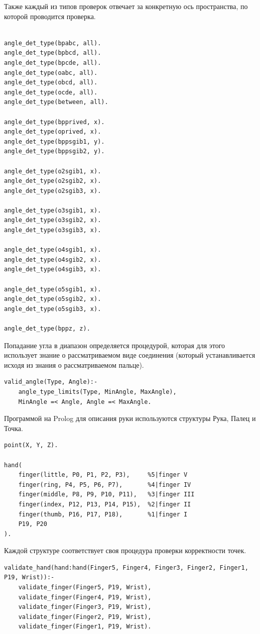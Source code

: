 Также каждый из типов проверок отвечает за конкретную ось пространства, по которой проводится проверка.
\begin{lstlisting}[caption=Знания об осях типов проверок, label=list:angle_det_type]
%angle_det_type(Type, Axis)

angle_det_type(bpabc, all).
angle_det_type(bpbcd, all).
angle_det_type(bpcde, all).
angle_det_type(oabc, all).
angle_det_type(obcd, all).
angle_det_type(ocde, all).
angle_det_type(between, all).

angle_det_type(bpprived, x).
angle_det_type(oprived, x).
angle_det_type(bppsgib1, y).
angle_det_type(bppsgib2, y).

angle_det_type(o2sgib1, x).
angle_det_type(o2sgib2, x).
angle_det_type(o2sgib3, x).

angle_det_type(o3sgib1, x).
angle_det_type(o3sgib2, x).
angle_det_type(o3sgib3, x).

angle_det_type(o4sgib1, x).
angle_det_type(o4sgib2, x).
angle_det_type(o4sgib3, x).

angle_det_type(o5sgib1, x).
angle_det_type(o5sgib2, x).
angle_det_type(o5sgib3, x).

angle_det_type(bppz, z).
\end{lstlisting}
Попадание угла в диапазон определяется процедурой, которая для этого использует знание о рассматриваемом виде соединения (который устанавливается исходя из знания о рассматриваемом пальце).
\begin{lstlisting}[caption=Проверка попадания угла в диапазон, label=list:valid_angle]
%valid_angle - check if angle is valid for finger
valid_angle(Type, Angle):-
	angle_type_limits(Type, MinAngle, MaxAngle),
	MinAngle =< Angle, Angle =< MaxAngle.
\end{lstlisting}
Программой на Prolog для описания руки используются структуры Рука, Палец и Точка.
\begin{lstlisting}[caption=Структуры, label=list:structures]
point(X, Y, Z).

hand(
	finger(little, P0, P1, P2, P3),		%5|finger V
	finger(ring, P4, P5, P6, P7),		%4|finger IV
	finger(middle, P8, P9, P10, P11),	%3|finger III
	finger(index, P12, P13, P14, P15),	%2|finger II
	finger(thumb, P16, P17, P18),		%1|finger I
	P19, P20							
).	
\end{lstlisting}
Каждой структуре соответствует своя процедура проверки корректности точек.
\begin{lstlisting}[caption=Процедура проверки корректности точек руки, label=list:validate_hand]
validate_hand(hand:hand(Finger5, Finger4, Finger3, Finger2, Finger1, P19, Wrist)):-
	validate_finger(Finger5, P19, Wrist),
	validate_finger(Finger4, P19, Wrist),
	validate_finger(Finger3, P19, Wrist),
	validate_finger(Finger2, P19, Wrist),
	validate_finger(Finger1, P19, Wrist).
\end{lstlisting}
